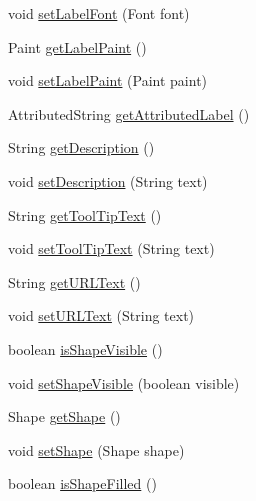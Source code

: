 \begin{DoxyCompactItemize}
\item 
void \mbox{\hyperlink{classorg_1_1jfree_1_1chart_1_1_legend_item_a20a86ff5e492a4bb6cf9baba5146e090}{set\+Label\+Font}} (Font font)
\item 
Paint \mbox{\hyperlink{classorg_1_1jfree_1_1chart_1_1_legend_item_a241d7f99531c0d5b85180111e8edb031}{get\+Label\+Paint}} ()
\item 
void \mbox{\hyperlink{classorg_1_1jfree_1_1chart_1_1_legend_item_acaa512c2d69e6b65ea5313b54b5e7236}{set\+Label\+Paint}} (Paint paint)
\item 
Attributed\+String \mbox{\hyperlink{classorg_1_1jfree_1_1chart_1_1_legend_item_a6553acc2837bf716adc7a03e215a5da3}{get\+Attributed\+Label}} ()
\item 
String \mbox{\hyperlink{classorg_1_1jfree_1_1chart_1_1_legend_item_ae9145881d91551b169d3e47ebbe024a4}{get\+Description}} ()
\item 
void \mbox{\hyperlink{classorg_1_1jfree_1_1chart_1_1_legend_item_a6260a832309908f4b41f005d9ace3f23}{set\+Description}} (String text)
\item 
String \mbox{\hyperlink{classorg_1_1jfree_1_1chart_1_1_legend_item_ab6b24eec75be7370f4fc8fe241932ff3}{get\+Tool\+Tip\+Text}} ()
\item 
void \mbox{\hyperlink{classorg_1_1jfree_1_1chart_1_1_legend_item_ae68b2cb07d9d47a099195c1e53cf7ac8}{set\+Tool\+Tip\+Text}} (String text)
\item 
String \mbox{\hyperlink{classorg_1_1jfree_1_1chart_1_1_legend_item_ae50e62bf0aebde30e8e8e1c5fac9952f}{get\+U\+R\+L\+Text}} ()
\item 
void \mbox{\hyperlink{classorg_1_1jfree_1_1chart_1_1_legend_item_a63d5f8c94b5296c1ccfb8adf20f79def}{set\+U\+R\+L\+Text}} (String text)
\item 
boolean \mbox{\hyperlink{classorg_1_1jfree_1_1chart_1_1_legend_item_a549f04415c2224b5c62def05fdcfe3c0}{is\+Shape\+Visible}} ()
\item 
void \mbox{\hyperlink{classorg_1_1jfree_1_1chart_1_1_legend_item_a87c9eb5f4151a2f1c3e753db786d7690}{set\+Shape\+Visible}} (boolean visible)
\item 
Shape \mbox{\hyperlink{classorg_1_1jfree_1_1chart_1_1_legend_item_a08b6718ae34a4c7be04cdf48494cc1d3}{get\+Shape}} ()
\item 
void \mbox{\hyperlink{classorg_1_1jfree_1_1chart_1_1_legend_item_a14e41e94aa2b13b01b1cf3c6ff12dc55}{set\+Shape}} (Shape shape)
\item 
boolean \mbox{\hyperlink{classorg_1_1jfree_1_1chart_1_1_legend_item_a7e46877398956ac078f85d76aed5cb9a}{is\+Shape\+Filled}} ()

\end{DoxyCompactItemize}
